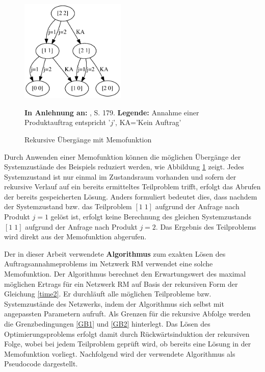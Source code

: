 \begin{figure}[h!]
  \begin{center}
    \includegraphics[width=50mm]{Bilder/Einfach2.pdf}
    \caption{Rekursive Übergänge mit Memofunktion}  \label{Einfach2}
        {\footnotesize \textbf{In Anlehnung an:} \cite{hetland2010python}, S. 179.} 
    {\footnotesize \textbf{Legende:} Annahme einer Produktauftrag entspricht '$j$', KA='Kein Auftrag'} 
  \end{center}
\end{figure}

Durch Anwenden einer Memofunktion können die möglichen Übergänge der Systemzustände des Beispiels reduziert werden, wie Abbildung \ref{Einfach2} zeigt. Jedes Systemzustand ist nur einmal im Zustandsraum vorhanden und sofern der rekursive Verlauf auf ein bereits ermitteltes Teilproblem trifft, erfolgt das Abrufen der bereits gespeicherten Lösung. Anders formuliert bedeutet dies, dass nachdem der Systemzustand bzw. das Teilproblem $[1\; 1]$ aufgrund der Anfrage nach Produkt $j=1$ gelöst ist, erfolgt keine Berechnung des gleichen Systemzustands $[1\; 1]$ aufgrund der Anfrage nach Produkt $j=2$. Das Ergebnis des Teilproblems wird direkt aus der Memofunktion abgerufen.

Der in dieser Arbeit verwendete \textbf{Algorithmus} zum exakten Lösen des Auftragsannahmeproblems im Netzwerk RM verwendet eine solche Memofunktion. Der Algorithmus berechnet den Erwartungswert des maximal möglichen Ertrags für ein Netzwerk RM auf Basis der rekursiven Form der Gleichung \eqref{time2}. Er durchläuft alle möglichen Teilprobleme bzw. Systemzustände des Netzwerks, indem der Algorithmus sich selbst mit angepassten Parametern aufruft. Als Grenzen für die rekursive Abfolge werden die Grenzbedingungen \eqref{GB1} und \eqref{GB2} hinterlegt. Das Lösen des Optimierungsproblems erfolgt damit durch Rückwärtsinduktion der rekursiven Folge, wobei bei jedem Teilproblem geprüft wird, ob bereits eine Lösung in der Memofunktion vorliegt. Nachfolgend wird der verwendete Algorithmus als Pseudocode dargestellt.


